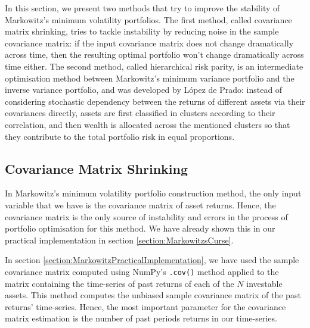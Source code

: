
In this section, we present two methods that try to improve the stability of Markowitz's minimum volatility portfolios. The first method, called covariance matrix shrinking, tries to tackle instability by reducing noise in the sample covariance matrix: if the input covariance matrix does not change dramatically across time, then the resulting optimal portfolio won't change dramatically across time either. The second method, called hierarchical risk parity, is an intermediate optimisation method between Markowitz's minimum variance portfolio and the inverse variance portfolio, and was developed by López de Prado: instead of considering stochastic dependency between the returns of different assets via their covariances directly, assets are first classified in clusters according to their correlation, and then wealth is allocated across the mentioned clusters so that they contribute to the total portfolio risk in equal proportions.

\subsection{Covariance Matrix Shrinking}\label{section:CovarianceMatrixShrinking}
	
	In Markowitz's minimum volatility portfolio construction method, the only input variable that we have is the covariance matrix of asset returns. Hence, the covariance matrix is the only source of instability and errors in the process of portfolio optimisation for this method. We have already shown this in our practical implementation in section \ref{section:MarkowitzsCurse}.
	
	In section \ref{section:MarkowitzPracticalImplementation}, we have used the sample covariance matrix computed using NumPy's \texttt{.cov()} method applied to the matrix containing the time-series of past returns of each of the $N$ investable assets. This method computes the unbiased sample covariance matrix of the past returns' time-series. Hence, the most important parameter for the covariance matrix estimation is the number of past periods returns in our time-series.
	
